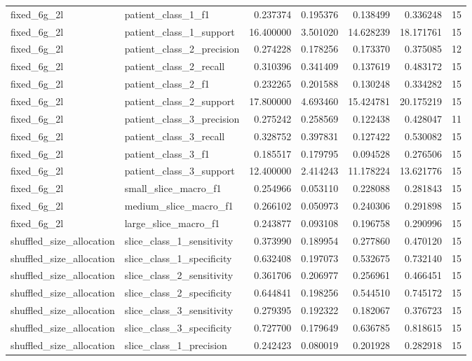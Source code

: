 \begin{tabular}{llrrrrr}
fixed_6g_2l & patient_class_1_f1 & 0.237374 & 0.195376 & 0.138499 & 0.336248 & 15 \\
fixed_6g_2l & patient_class_1_support & 16.400000 & 3.501020 & 14.628239 & 18.171761 & 15 \\
fixed_6g_2l & patient_class_2_precision & 0.274228 & 0.178256 & 0.173370 & 0.375085 & 12 \\
fixed_6g_2l & patient_class_2_recall & 0.310396 & 0.341409 & 0.137619 & 0.483172 & 15 \\
fixed_6g_2l & patient_class_2_f1 & 0.232265 & 0.201588 & 0.130248 & 0.334282 & 15 \\
fixed_6g_2l & patient_class_2_support & 17.800000 & 4.693460 & 15.424781 & 20.175219 & 15 \\
fixed_6g_2l & patient_class_3_precision & 0.275242 & 0.258569 & 0.122438 & 0.428047 & 11 \\
fixed_6g_2l & patient_class_3_recall & 0.328752 & 0.397831 & 0.127422 & 0.530082 & 15 \\
fixed_6g_2l & patient_class_3_f1 & 0.185517 & 0.179795 & 0.094528 & 0.276506 & 15 \\
fixed_6g_2l & patient_class_3_support & 12.400000 & 2.414243 & 11.178224 & 13.621776 & 15 \\
fixed_6g_2l & small_slice_macro_f1 & 0.254966 & 0.053110 & 0.228088 & 0.281843 & 15 \\
fixed_6g_2l & medium_slice_macro_f1 & 0.266102 & 0.050973 & 0.240306 & 0.291898 & 15 \\
fixed_6g_2l & large_slice_macro_f1 & 0.243877 & 0.093108 & 0.196758 & 0.290996 & 15 \\
shuffled_size_allocation & slice_class_1_sensitivity & 0.373990 & 0.189954 & 0.277860 & 0.470120 & 15 \\
shuffled_size_allocation & slice_class_1_specificity & 0.632408 & 0.197073 & 0.532675 & 0.732140 & 15 \\
shuffled_size_allocation & slice_class_2_sensitivity & 0.361706 & 0.206977 & 0.256961 & 0.466451 & 15 \\
shuffled_size_allocation & slice_class_2_specificity & 0.644841 & 0.198256 & 0.544510 & 0.745172 & 15 \\
shuffled_size_allocation & slice_class_3_sensitivity & 0.279395 & 0.192322 & 0.182067 & 0.376723 & 15 \\
shuffled_size_allocation & slice_class_3_specificity & 0.727700 & 0.179649 & 0.636785 & 0.818615 & 15 \\
shuffled_size_allocation & slice_class_1_precision & 0.242423 & 0.080019 & 0.201928 & 0.282918 & 15 \\

\end{tabular}
